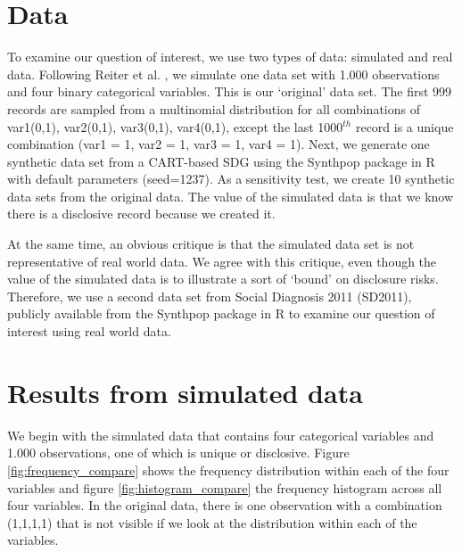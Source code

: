 \documentclass[runningheads]{llncs}
\begin{document}
\section{Data}

To examine our question of interest, we use two types of data: simulated and real data.  Following Reiter et al. \cite{reiter2014bayesian}, we simulate one data set with 1.000 observations and four binary categorical variables.  This is our `original' data set.  The first 999 records are sampled from a multinomial distribution for all combinations of var1(0,1), var2(0,1), var3(0,1), var4(0,1), except the last 1000$^{th}$ record is a unique combination (var1 = 1, var2 = 1, var3 = 1, var4 = 1).  Next, we generate one synthetic data set from a CART-based SDG using the Synthpop package in R with default parameters (seed=1237).  As a sensitivity test, we create 10 synthetic data sets from the original data.  The value of the simulated data is that we know there is a disclosive record because we created it.

At the same time, an obvious critique is that the simulated data set is not representative of real world data.  We agree with this critique, even though the value of the simulated data is to illustrate a sort of `bound' on disclosure risks.  Therefore, we use a second data set from Social Diagnosis 2011 (SD2011), publicly available from the Synthpop package in R to examine our question of interest using real world data.

\section{Results from simulated data}

We begin with the simulated data that contains four categorical variables and 1.000 observations, one of which is unique or disclosive. Figure \ref{fig:frequency_compare} shows the frequency distribution within each of the four variables and figure \ref{fig:histogram_compare} the frequency histogram across all four variables.  In the original data, there is one observation with a combination (1,1,1,1) that is not visible if we look at the distribution within each of the variables.  
\end{document}
